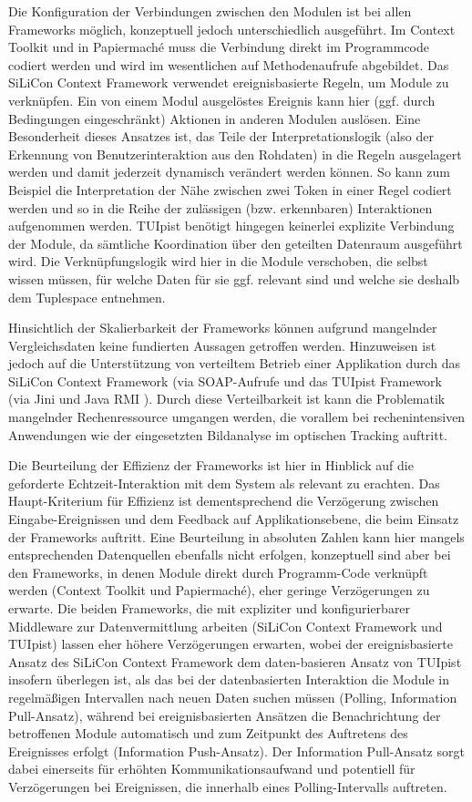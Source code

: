 Die Konfiguration der Verbindungen zwischen den Modulen ist bei allen Frameworks möglich, konzeptuell jedoch unterschiedlich ausgeführt. Im Context Toolkit und in Papiermaché muss die Verbindung direkt im Programmcode codiert werden und wird im wesentlichen auf Methodenaufrufe abgebildet. Das SiLiCon Context Framework verwendet ereignisbasierte Regeln, um Module zu verknüpfen. Ein von einem Modul ausgelöstes Ereignis kann hier (ggf. durch Bedingungen eingeschränkt) Aktionen in anderen Modulen auslösen. Eine Besonderheit dieses Ansatzes ist, das Teile der Interpretationslogik (also der Erkennung von Benutzerinteraktion aus den Rohdaten) in die Regeln ausgelagert werden und damit jederzeit dynamisch verändert werden können. So kann zum Beispiel die Interpretation der Nähe zwischen zwei Token in einer Regel codiert werden und so in die Reihe der zulässigen (bzw. erkennbaren) Interaktionen aufgenommen werden. TUIpist benötigt hingegen keinerlei explizite Verbindung der Module, da sämtliche Koordination über den geteilten Datenraum ausgeführt wird. Die Verknüpfungslogik wird hier in die Module verschoben, die selbst wissen müssen, für welche Daten für sie ggf. relevant sind und welche sie deshalb dem Tuplespace entnehmen.

Hinsichtlich der Skalierbarkeit der Frameworks können aufgrund mangelnder Vergleichsdaten keine fundierten Aussagen getroffen werden. Hinzuweisen ist jedoch auf die Unterstützung von verteiltem Betrieb einer Applikation durch das SiLiCon Context Framework (via SOAP-Aufrufe \citep{Curbera02} und das TUIpist Framework (via Jini und Java RMI \cite{Downing98}). Durch diese Verteilbarkeit ist kann die Problematik mangelnder Rechenressource umgangen werden, die vorallem bei rechenintensiven Anwendungen wie der eingesetzten Bildanalyse im optischen Tracking auftritt.

Die Beurteilung der Effizienz der Frameworks ist hier in Hinblick auf die geforderte Echtzeit-Interaktion mit dem System als relevant zu erachten. Das Haupt-Kriterium für Effizienz ist dementsprechend die Verzögerung zwischen Eingabe-Ereignissen und dem Feedback auf Applikationsebene, die beim Einsatz der Frameworks auftritt. Eine Beurteilung in absoluten Zahlen kann hier mangels entsprechenden Datenquellen ebenfalls nicht erfolgen, konzeptuell sind aber bei den Frameworks, in denen Module direkt durch Programm-Code verknüpft werden (Context Toolkit und Papiermaché), eher geringe Verzögerungen zu erwarte. Die beiden Frameworks, die mit expliziter und konfigurierbarer Middleware zur Datenvermittlung arbeiten (SiLiCon Context Framework und TUIpist) lassen eher höhere Verzögerungen erwarten, wobei der ereignisbasierte Ansatz des SiLiCon Context Framework dem daten-basieren Ansatz von TUIpist insofern überlegen ist, als das bei der datenbasierten Interaktion die Module in regelmäßigen Intervallen nach neuen Daten suchen müssen (Polling, Information Pull-Ansatz), während bei ereignisbasierten Ansätzen die Benachrichtung der betroffenen Module automatisch und zum Zeitpunkt des Auftretens des Ereignisses erfolgt (Information Push-Ansatz). Der Information Pull-Ansatz sorgt dabei einerseits für erhöhten Kommunikationsaufwand und potentiell für Verzögerungen bei Ereignissen, die innerhalb eines Polling-Intervalls auftreten.

